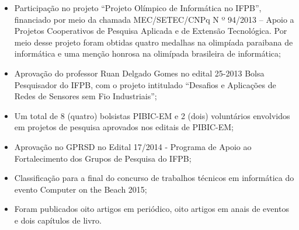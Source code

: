 \begin{itemize}
\item Participação no projeto ``Projeto Olímpico de Informática no IFPB'', financiado por meio da chamada MEC/SETEC/CNPq N º 94/2013 – Apoio a Projetos Cooperativos de Pesquisa Aplicada e de Extensão Tecnológica. Por meio desse projeto foram obtidas quatro medalhas na olimp\'iada paraibana de inform\'atica e uma men\c{c}\~ao honrosa na olim\'ipada brasileira de inform\'atica;

\item Aprovação do professor Ruan Delgado Gomes no edital 25-2013 Bolsa Pesquisador do IFPB, com o projeto intitulado “Desafios e Aplicações de Redes de Sensores sem Fio Industriais”;

\item Um total de 8 (quatro) bolsistas PIBIC-EM e 2 (dois) voluntários envolvidos em projetos de pesquisa aprovados nos editais de PIBIC-EM;

\item Aprovação no GPRSD no Edital 17/2014 - Programa de Apoio ao Fortalecimento dos Grupos de Pesquisa do IFPB;

\item Classifica\c{c}\~ao para a final do concurso de trabalhos t\'ecnicos em inform\'atica do evento Computer on the Beach 2015;

\item Foram publicados oito artigos em peri\'odico, oito artigos em anais de eventos e dois cap\'itulos de livro.

\end{itemize}


